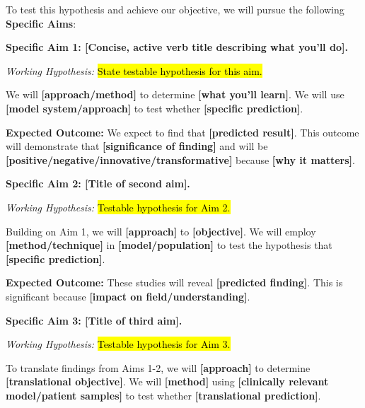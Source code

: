\documentclass[11pt,letterpaper]{article}
\begin{document}

To test this hypothesis and achieve our objective, we will pursue the following \textbf{Specific Aims}:

\vspace{0.3cm}


\noindent\textbf{Specific Aim 1: [Concise, active verb title describing what you'll do].}

\textit{Working Hypothesis:} \hl{State testable hypothesis for this aim.}

We will \textbf{[approach/method]} to determine \textbf{[what you'll learn]}. We will use \textbf{[model system/approach]} to test whether \textbf{[specific prediction]}.

\textbf{Expected Outcome:} We expect to find that \textbf{[predicted result]}. This outcome will demonstrate that \textbf{[significance of finding]} and will be \textbf{[positive/negative/innovative/transformative]} because \textbf{[why it matters]}.

\vspace{0.3cm}


\noindent\textbf{Specific Aim 2: [Title of second aim].}

\textit{Working Hypothesis:} \hl{Testable hypothesis for Aim 2.}

Building on Aim 1, we will \textbf{[approach]} to \textbf{[objective]}. We will employ \textbf{[method/technique]} in \textbf{[model/population]} to test the hypothesis that \textbf{[specific prediction]}.

\textbf{Expected Outcome:} These studies will reveal \textbf{[predicted finding]}. This is significant because \textbf{[impact on field/understanding]}.

\vspace{0.3cm}


\noindent\textbf{Specific Aim 3: [Title of third aim].}

\textit{Working Hypothesis:} \hl{Testable hypothesis for Aim 3.}

To translate findings from Aims 1-2, we will \textbf{[approach]} to determine \textbf{[translational objective]}. We will \textbf{[method]} using \textbf{[clinically relevant model/patient samples]} to test whether \textbf{[translational prediction]}.
\end{document}
